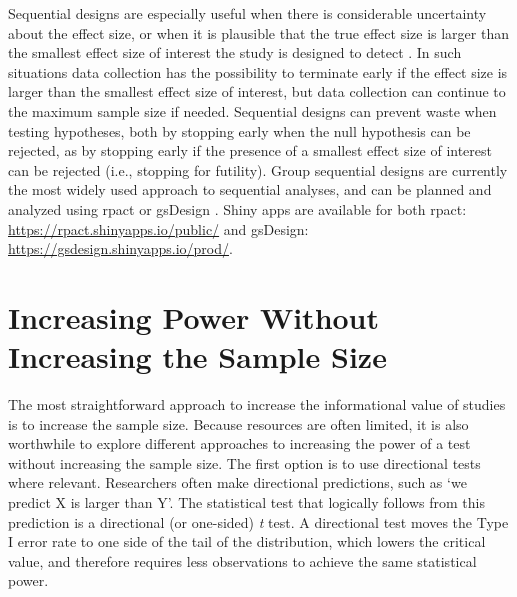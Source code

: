 \documentclass[
  oneside]{book}
\begin{document}
Sequential designs are especially useful when there is considerable uncertainty about the effect size, or when it is plausible that the true effect size is larger than the smallest effect size of interest the study is designed to detect \citep{lakens_performing_2014}. In such situations data collection has the possibility to terminate early if the effect size is larger than the smallest effect size of interest, but data collection can continue to the maximum sample size if needed. Sequential designs can prevent waste when testing hypotheses, both by stopping early when the null hypothesis can be rejected, as by stopping early if the presence of a smallest effect size of interest can be rejected (i.e., stopping for futility). Group sequential designs are currently the most widely used approach to sequential analyses, and can be planned and analyzed using rpact \citep{wassmer_rpact_2019} or gsDesign \citep{anderson_group_2014}. Shiny apps are available for both rpact: \url{https://rpact.shinyapps.io/public/} and gsDesign: \url{https://gsdesign.shinyapps.io/prod/}.

\hypertarget{increasing-power-without-increasing-the-sample-size}{%
\section{Increasing Power Without Increasing the Sample Size}\label{increasing-power-without-increasing-the-sample-size}}

The most straightforward approach to increase the informational value of studies is to increase the sample size. Because resources are often limited, it is also worthwhile to explore different approaches to increasing the power of a test without increasing the sample size. The first option is to use directional tests where relevant. Researchers often make directional predictions, such as `we predict X is larger than Y'. The statistical test that logically follows from this prediction is a directional (or one-sided) \emph{t} test. A directional test moves the Type I error rate to one side of the tail of the distribution, which lowers the critical value, and therefore requires less observations to achieve the same statistical power.
\end{document}
